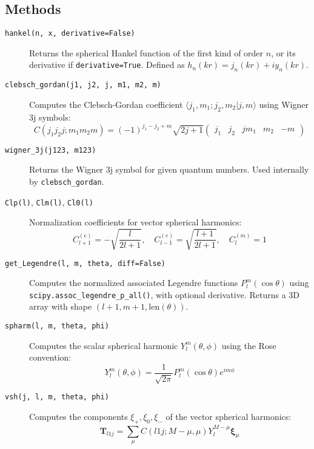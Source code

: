 \subsection{Methods}
\begin{description}
    \item[\texttt{hankel(n, x, derivative=False)}]
    Returns the spherical Hankel function of the first kind of order \( n \), or its derivative if \texttt{derivative=True}. Defined as \( h_n(kr) = j_n(kr) + i y_n(kr) \).

    \item[\texttt{clebsch\_gordan(j1, j2, j, m1, m2, m)}]
    Computes the Clebsch-Gordan coefficient \( \langle j_1, m_1; j_2, m_2 | j, m \rangle \) using Wigner 3j symbols:
    \[
    C(j_1 j_2 j; m_1 m_2 m) = (-1)^{j_1 - j_2 + m} \sqrt{2j + 1}
    \begin{pmatrix}
    j_1 & j_2 & j 
    m_1 & m_2 & -m
    \end{pmatrix}
    \]

    \item[\texttt{wigner\_3j(j123, m123)}]
    Returns the Wigner 3j symbol for given quantum numbers. Used internally by \texttt{clebsch\_gordan}.

    \item[\texttt{Clp(l)}, \texttt{Clm(l)}, \texttt{Cl0(l)}]
    Normalization coefficients for vector spherical harmonics:
    \[
    C_{l+1}^{(e)} = -\sqrt{\frac{l}{2l+1}}, \quad
    C_{l-1}^{(e)} = \sqrt{\frac{l+1}{2l+1}}, \quad
    C_l^{(m)} = 1
    \]

    \item[\texttt{get\_Legendre(l, m, theta, diff=False)}]
    Computes the normalized associated Legendre functions \( P_{l}^{m}(\cos\theta) \) using \texttt{scipy.assoc\_legendre\_p\_all()}, with optional derivative. Returns a 3D array with shape \((l+1, m+1, \text{len}(\theta))\).

    \item[\texttt{spharm(l, m, theta, phi)}]
    Computes the scalar spherical harmonic \( Y_l^m(\theta, \phi) \) using the Rose convention:
    \[
    Y_l^m (\theta, \phi) = \frac{1}{\sqrt{2\pi}} P_l^m(\cos\theta) e^{im\phi}
    \]

    \item[\texttt{vsh(j, l, m, theta, phi)}]
    Computes the components \( \xi_+, \xi_0, \xi_- \) of the vector spherical harmonics:
    \[
    \mathbf{T}_{l1j} = \sum_\mu C(l1j; M - \mu, \mu) Y_l^{M - \mu} \boldsymbol{\xi}_\mu
    \]


\end{description}

